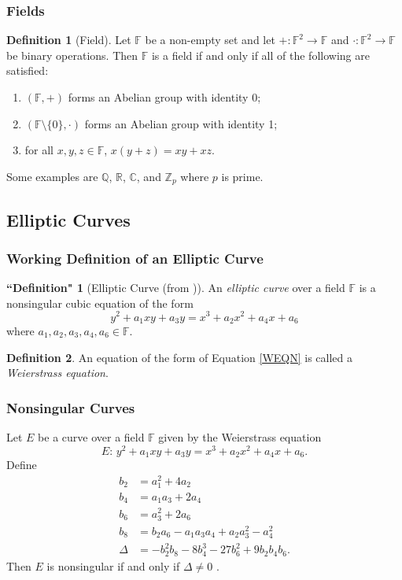 \documentclass[xcolor=pdftex,dvipsnames,table]{beamer}
\theoremstyle{plain}
\theoremstyle{definition}
\newtheorem{defn}{Definition}[section]
\newtheorem{defns}{``Definition"}[section]
\def\CC{\mathbb{C}}
\def\RR{\mathbb{R}}
\def\ZZ{\mathbb{Z}}
\def\QQ{\mathbb{Q}}
\def\FF{\mathbb{F}}
\newcommand{\set}[1]{\lbrace #1 \rbrace}
\begin{document}
\begin{frame}
	\frametitle{Fields}
	
	\begin{defn}[Field]
		Let $\FF$ be a non-empty set and let $+:\FF^2\rightarrow\FF$ and $\cdot:\FF^2\rightarrow\FF$ be binary operations.
		Then $\FF$ is a field if and only if all of the following are satisfied:
		\begin{enumerate}
			\item $(\FF,+)$ forms an Abelian group with identity 0;
			\item $(\FF\setminus\set{0},\cdot)$ forms an Abelian group with identity 1;
			\item for all $x,y,z\in\FF$, $x(y+z)=xy+xz$.
		\end{enumerate}
	\end{defn}
	
	Some examples are $\QQ$, $\RR$, $\CC$, and $\ZZ_p$ where $p$ is prime.
\end{frame}

\subsection[Elliptic Curves]{Elliptic Curves}

\begin{frame}
	\frametitle{Working Definition of an Elliptic Curve}
	
	\begin{defns}[Elliptic Curve (from \cite{AEC})]
		An \textit{elliptic curve} over a field $\FF$ is a nonsingular cubic equation of the form
		\begin{equation}\label{WEQN}
		y^2+a_1xy+a_3y=x^3+a_2x^2+a_4x+a_6
		\end{equation}
		where $a_1,a_2,a_3,a_4,a_6\in\FF$.
	\end{defns}
	\begin{defn}
		An equation of the form of Equation \autoref{WEQN} is called a \textit{Weierstrass equation}.
	\end{defn}
\end{frame}

\begin{frame}
	\frametitle{Nonsingular Curves}
	
	Let $E$ be a curve over a field $\FF$ given by the Weierstrass equation
	\[
	E:\,y^2+a_1xy+a_3y=x^3+a_2x^2+a_4x+a_6.
	\]
	Define
	\begin{align*}
	b_2 & = a_1^2 + 4a_2\\
	b_4 & = a_1a_3+2a_4 \\
	b_6 & = a_3^2 +2a_6 \\
	b_8 & = b_2a_6-a_1a_3a_4+a_2a_3^2-a_4^2\\
	\Delta & = -b_2^2b_8-8b_4^3-27b_6^2+9b_2b_4b_6.
	\end{align*}
	Then $E$ is nonsingular if and only if $\Delta\neq 0$ \cite{AEC}.
\end{frame}
\end{document}

